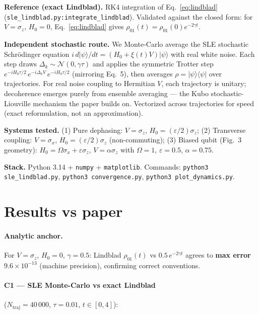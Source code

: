 \documentclass[11pt]{article}
\begin{document}
\textbf{Reference (exact Lindblad).}  RK4 integration of
Eq.~\eqref{eq:lindblad} (\texttt{sle\_lindblad.py:integrate\_lindblad}).
Validated against the closed form: for $V=\sigma_z$, $H_0=0$,
Eq.~\eqref{eq:lindblad} gives $\rho_{01}(t)=\rho_{01}(0)e^{-2\gamma t}$.

\textbf{Independent stochastic route.}  We Monte-Carlo average the SLE
stochastic Schr\"odinger equation
$i\,d|\psi\rangle/dt = (H_0 + \xi(t)V)|\psi\rangle$ with real white noise.
Each step draws $\Delta_k \sim \mathcal{N}(0,\gamma\tau)$ and applies the
symmetric Trotter step $e^{-iH_0\tau/2}\,e^{-i\Delta_k V}\,e^{-iH_0\tau/2}$
(mirroring Eq.~5), then averages $\rho=|\psi\rangle\langle\psi|$ over
trajectories.  For real noise coupling to Hermitian $V$, each trajectory is
unitary; decoherence emerges purely from ensemble averaging --- the Kubo
stochastic-Liouville mechanism the paper builds on.  Vectorized across
trajectories for speed (exact reformulation, not an approximation).

\textbf{Systems tested.}
(1) Pure dephasing: $V=\sigma_z$, $H_0=(\varepsilon/2)\sigma_z$;
(2) Transverse coupling: $V=\sigma_x$, $H_0=(\varepsilon/2)\sigma_z$
(non-commuting);
(3) Biased qubit (Fig.~3 geometry):
$H_0=\Omega\sigma_x + \varepsilon\sigma_z$, $V=\alpha\sigma_z$ with
$\Omega=1$, $\varepsilon=0.5$, $\alpha=0.75$.

\textbf{Stack.}  Python 3.14 + \texttt{numpy} + \texttt{matplotlib}.
Commands: \verb|python3 sle_lindblad.py|, \verb|python3 convergence.py|,
\verb|python3 plot_dynamics.py|.

\section{Results vs paper}

\paragraph{Analytic anchor.} For $V=\sigma_z$, $H_0=0$, $\gamma=0.5$:
Lindblad $\rho_{01}(t)$ vs $0.5\,e^{-2\gamma t}$ agrees to
\textbf{max error $9.6\times 10^{-13}$} (machine precision), confirming
correct conventions.

\paragraph{C1 --- SLE Monte-Carlo vs exact Lindblad}
($N_{\mathrm{traj}}=40\,000$, $\tau=0.01$, $t\in[0,4]$):
\end{document}
